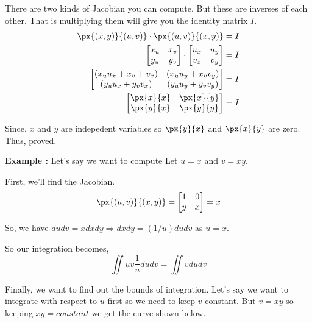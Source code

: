 There are two kinds of Jacobian you can compute. But these are inverses of each other.
That is multiplying them will give you the identity matrix $I$.
\begin{align*}
    \px{(x, y)}{(u, v)} \cdot \px{(u, v)}{(x, y)} = I \\
    \begin{bmatrix}
        x_u & x_v \\
        y_u & y_v
    \end{bmatrix}
    \cdot
    \begin{bmatrix}
        u_x & u_y \\
        v_x & v_y
    \end{bmatrix} = I \\
    \begin{bmatrix}
        (x_u u_x + x_v + v_x) & (x_u u_y + x_v v_y) \\
        (y_u u_x + y_v v_x) & (y_u u_y + y_v v_y) \\
    \end{bmatrix} = I \\
    \begin{bmatrix}
        \px{x}{x} & \px{x}{y} \\
        \px{y}{x} & \px{y}{y}
    \end{bmatrix} = I \\
\end{align*}

Since, $x$ and $y$ are indepedent variables so $\px{y}{x}$ and $\px{x}{y}$ are zero.
Thus, proved.


{\bf Example : } Let's say we want to compute 
Let $u = x$ and $v = xy$.

First, we'll find the Jacobian.
$$
\px{(u, v)}{(x, y)}  = 
    \begin{bmatrix}
        1 & 0 \\
        y & x \\
    \end{bmatrix} 
    = x
$$

So, we have $du dv = x dx dy \Rightarrow dx dy = (1/u) du dv$ as $ u = x $.

So our integration becomes,
$$ \iint uv \frac{1}{u} du dv = \iint v du dv $$

Finally, we want to find out the bounds of integration.
Let's say we want to integrate with respect to $u$ first so we need to keep $v$ constant.
But $v = xy$ so keeping $xy = constant$ we get the curve shown below.

